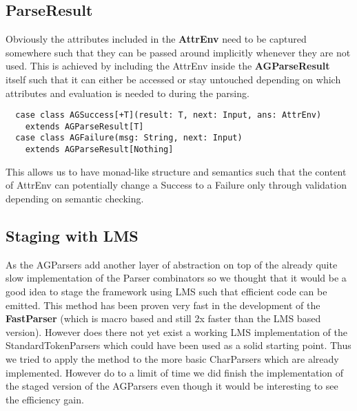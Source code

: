 \subsection{ParseResult}
Obviously the attributes included in the \textbf{AttrEnv} need to be captured somewhere such that they can be passed around implicitly whenever they are not used. This is achieved by including the AttrEnv inside the \textbf{AGParseResult} itself such that it can either be accessed or stay untouched depending on which attributes and evaluation is needed to during the parsing.

\begin{lstlisting}
  case class AGSuccess[+T](result: T, next: Input, ans: AttrEnv)
    extends AGParseResult[T]
  case class AGFailure(msg: String, next: Input)
    extends AGParseResult[Nothing]
\end{lstlisting}

This allows us to have monad-like structure and semantics such that the content of AttrEnv can potentially change a Success to a Failure only through validation depending on semantic checking.

\subsection{Staging with LMS}
As the AGParsers add another layer of abstraction on top of the already quite slow implementation of the Parser combinators so we thought that it would be a good idea to stage the framework using LMS such that efficient code can be emitted. This method has been proven very fast in the development of the \textbf{FastParser}\cite{fastparsers} (which is macro based and still 2x faster than the LMS based version).
However does there not yet exist a working LMS implementation of the StandardTokenParsers which could have been used as a solid starting point. Thus we tried to apply the method to the more basic CharParsers which are already implemented.
However do to a limit of time we did finish the implementation of the staged version of the AGParsers even though it would be interesting to see the efficiency gain.
